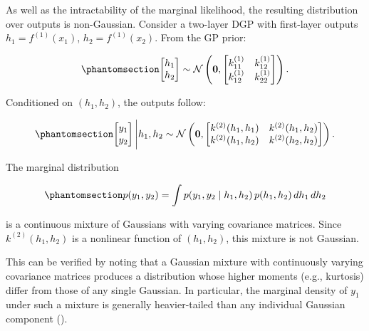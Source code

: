 \documentclass[
  letterpaper,
  DIV=11,
  numbers=noendperiod]{scrartcl}
\begin{document}
As well as the intractability of the marginal likelihood, the resulting
distribution over outputs is non-Gaussian. Consider a two-layer DGP with
first-layer outputs \(h_1 = f^{(1)}(x_1)\), \(h_2 = f^{(1)}(x_2)\). From
the GP prior:

\begin{equation}\phantomsection\label{eq-first_layer_joint}{
\begin{bmatrix} h_1 \\ h_2 \end{bmatrix} \sim \mathcal{N}\left(\mathbf{0}, \begin{bmatrix} k^{(1)}_{11} & k^{(1)}_{12} \\ k^{(1)}_{12} & k^{(1)}_{22} \end{bmatrix}\right).
}\end{equation}

Conditioned on \((h_1, h_2)\), the outputs follow:

\begin{equation}\phantomsection\label{eq-second_layer_conditional}{
\begin{bmatrix} y_1 \\ y_2 \end{bmatrix} \Bigg| h_1, h_2 \sim \mathcal{N}\left(\mathbf{0}, \begin{bmatrix} k^{(2)}(h_1, h_1) & k^{(2)}(h_1, h_2) \\ k^{(2)}(h_1, h_2) & k^{(2)}(h_2, h_2) \end{bmatrix}\right).
}\end{equation}

The marginal distribution

\begin{equation}\phantomsection\label{eq-marginal_y}{
p(y_1, y_2) = \int p(y_1, y_2 \mid h_1, h_2) \, p(h_1, h_2) \, dh_1 \, dh_2
}\end{equation}

is a continuous mixture of Gaussians with varying covariance matrices.
Since \(k^{(2)}(h_1, h_2)\) is a nonlinear function of \((h_1, h_2)\),
this mixture is not Gaussian.

This can be verified by noting that a Gaussian mixture with continuously
varying covariance matrices produces a distribution whose higher moments
(e.g., kurtosis) differ from those of any single Gaussian. In
particular, the marginal density of \(y_1\) under such a mixture is
generally heavier-tailed than any individual Gaussian component
().
\end{document}
